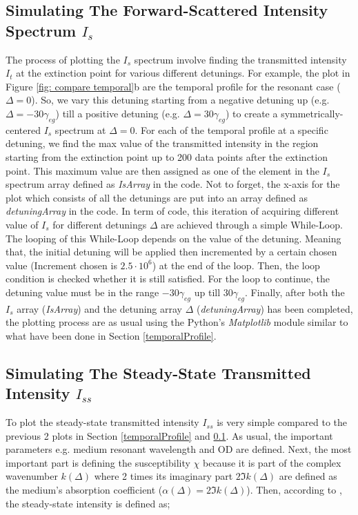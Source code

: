 \subsection{Simulating The Forward-Scattered Intensity Spectrum $I_{s}$}\label{forwardScattered}
The process of plotting the $I_{s}$ spectrum involve finding the transmitted intensity $I_{t}$ at the extinction point for various different detunings. For example, the plot in Figure \ref{fig: compare temporal}b are the temporal profile for the resonant case ($\Delta = 0$). So, we vary this detuning starting from a negative detuning up (e.g. $\Delta = -30\gamma_{eg}$) till a positive detuning (e.g. $\Delta = 30\gamma_{eg}$) to create a symmetrically-centered $I_{s}$ spectrum at $\Delta = 0$. For each of the temporal profile at a specific detuning, we find the max value of the transmitted intensity in the region starting from the extinction point up to 200 data points after the extinction point. This maximum value are then assigned as one of the element in the $I_{s}$ spectrum array defined as \textit{IsArray} in the code. Not to forget, the x-axis for the plot which consists of all the detunings are put into an array defined as \textit{detuningArray} in the code. In term of code, this iteration of acquiring different value of $I_{s}$ for different detunings $\Delta$ are achieved through a simple While-Loop. The looping of this While-Loop depends on the value of the detuning. Meaning that, the initial detuning will be applied then incremented by a certain chosen value (Increment chosen is $2.5 \cdot 10^{6}$) at the end of the loop. Then, the loop condition is checked whether it is still satisfied. For the loop to continue, the detuning value must be in the range $-30\gamma_{eg}$ up till $30\gamma_{eg}$. Finally, after both the $I_{s}$ array (\textit{IsArray}) and the detuning array $\Delta$ (\textit{detuningArray}) has been completed, the plotting process are as usual using the Python's \textit{Matplotlib} module similar to what have been done in Section \ref{temporalProfile}. 

\subsection{Simulating The Steady-State Transmitted Intensity $I_{ss}$}\label{steady}
To plot the steady-state transmitted intensity $I_{ss}$ is very simple compared to the previous 2 plots in Section \ref{temporalProfile} and \ref{forwardScattered}. As usual, the important parameters e.g. medium resonant wavelength and OD are defined. Next, the most important part is defining the susceptibility $\chi$ because it is part of the complex wavenumber $k(\Delta)$ where 2 times its imaginary part $2\Im{k(\Delta)}$ are defined as the medium's absorption coefficient ($\alpha(\Delta) = 2\Im{k(\Delta)}$). Then, according to \cite{boyd2020nonlinear}, the steady-state intensity is defined as;

